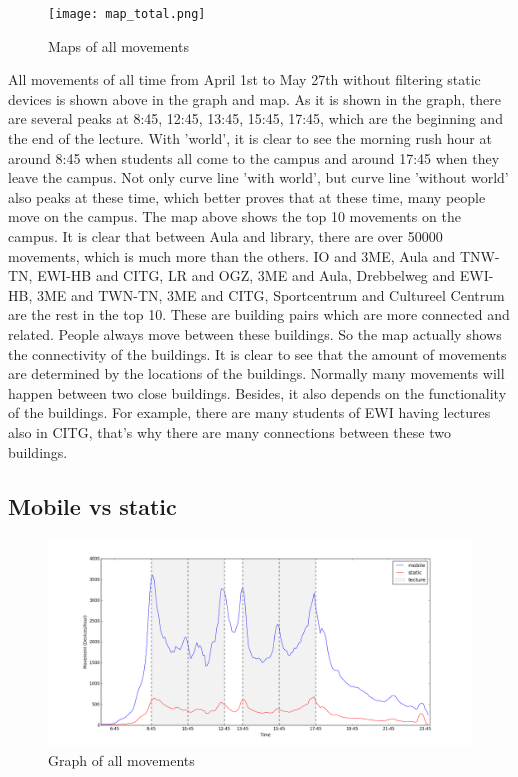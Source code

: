 \begin{figure}[H]
	\centering
	\texttt{[image: map\_total.png]}
	\captionsetup{justification=centering}
	\caption{Maps of all movements}
	\label{building_all_map}
\end{figure}
All movements of all time from April 1st to May 27th without filtering static devices is shown above in the graph and map. As it is shown in the graph, there are several peaks at 8:45, 12:45, 13:45, 15:45, 17:45, which are the beginning and the end of the lecture. With 'world', it is clear to see the morning rush hour at around 8:45 when students all come to the campus and around 17:45 when they leave the campus. Not only curve line 'with world', but curve line 'without world' also peaks at these time, which better proves that at these time, many people move on the campus.
The map above shows the top 10 movements on the campus. It is clear that between Aula and library, there are over 50000 movements, which is much more than the others. IO and 3ME, Aula and TNW-TN, EWI-HB and CITG, LR and OGZ, 3ME and Aula, Drebbelweg and EWI-HB, 3ME and TWN-TN, 3ME and CITG, Sportcentrum and Cultureel Centrum are the rest in the top 10. These are building pairs which are more connected and related. People always move between these buildings. So the map actually shows the connectivity of the buildings. It is clear to see that the amount of movements are determined by the locations of the buildings. Normally many movements will happen between two close buildings. Besides, it also depends on the functionality of the buildings. For example, there are many students of EWI having lectures also in CITG, that's why there are many connections between these two buildings.

\subsection{Mobile vs static}\label{chapter9mobilestatic}
\begin{figure}[H]
	\centering
	\includegraphics[scale=0.3]{building_mobileStatic_graph.png}
	\captionsetup{justification=centering}
	\caption{Graph of all movements}
	\label{building_mobileStatic_graph}
\end{figure}


